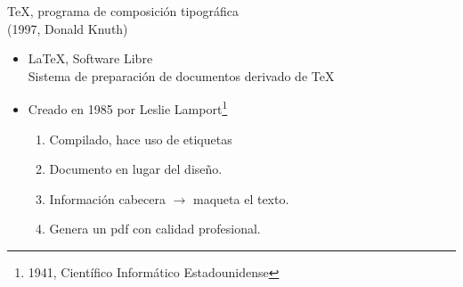 
\begin{frame}
   TeX, programa de composición tipográfica \\(1997, Donald Knuth)
   \begin{itemize}
        \item LaTeX, Software Libre \\Sistema de preparaci\'on de documentos derivado de TeX
        \item Creado en 1985 por Leslie Lamport\footnote{1941, Científico Informático Estadounidense}
        \vspace{1.5cm}
        \begin{enumerate}
            \item Compilado, hace uso de etiquetas
            \item Documento en lugar del diseño.
            \item Información cabecera $\rightarrow$ maqueta el texto.
            \item Genera un pdf con calidad profesional.
        \end{enumerate}
    \end{itemize}    
\end{frame}
